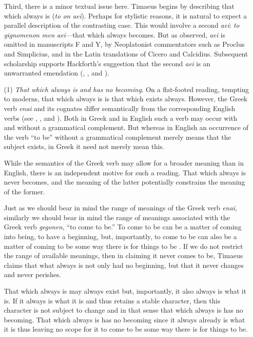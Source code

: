 Third, there is a minor textual issue here. Timaeus begins by describing that which always is (\emph{to on aei}). Perhaps for stylistic reasons, it is natural to expect a parallel description of the contrasting case. This would involve a second \emph{aei}: \emph{to gignomenon men aei}---that which always becomes. But as \citet{Hackforth:1959dj} observed, \emph{aei} is omitted in manuscripts F and Y, by Neoplatonist commentators such as Proclus and Simplicius, and in the Latin translations of Cicero and Calcidius. Subsequent scholarship supports Hackforth's suggestion that the second \emph{aei} is an unwarranted emendation (\citealt{Whittaker:1969mq,Whittaker:1973nz}, \citealt{Robinson:1979wk}, and \citealt{Dillon:1989hc}). 

(1) \emph{That which always is and has no becoming}. On a flat-footed reading, tempting to moderns, that which always is is that which exists always. However, the Greek verb \emph{enai} and its cognates differ semantically from the corresponding English verbs (see \citealt{Kahn:2009kx}, \citealt{Brown:1994aa}, and \citealt{Leigh:2008aa}). Both in Greek and in English such a verb may occur with and without a grammatical complement. But whereas in English an occurrence of the verb ``to be'' without a grammatical complement merely means that the subject exists, in Greek it need not merely mean this. 

While the semantics of the Greek verb may allow for a broader meaning than in English, there is an independent motive for such a reading. That which always is never becomes, and the meaning of the latter potentially constrains the meaning of the former. 

Just as we should bear in mind the range of meanings of the Greek verb \emph{enai}, similarly we should bear in mind the range of meanings associated with the Greek verb \emph{gegonen}, ``to come to be.'' To come to be can be a matter of coming into being, to have a beginning, but, importantly, to come to be can also be a matter of coming to be some way there is for things to be \citep[24--5]{Cornford:1935fk}. If we do not restrict the range of available meanings, then in claiming it never comes to be, Timaeus claims that what always is not only had no beginning, but that it never changes and never perishes.

That which always is may always exist but, importantly, it also always is what it is. If it always is what it is and thus retains a stable character, then this character is not subject to change and in that sense that which always is has no becoming. That which always is has no becoming since it always already is what it is thus leaving no scope for it to come to be some way there is for things to be. 


